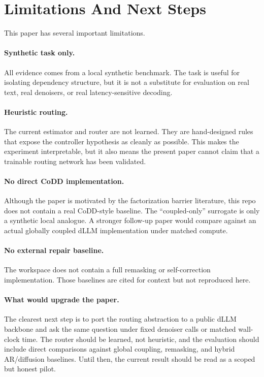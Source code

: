 \section{Limitations And Next Steps}
\label{sec:limitations}

This paper has several important limitations.

\paragraph{Synthetic task only.}
All evidence comes from a local synthetic benchmark. The task is useful for isolating dependency structure, but it is not a substitute for evaluation on real text, real denoisers, or real latency-sensitive decoding.

\paragraph{Heuristic routing.}
The current estimator and router are not learned. They are hand-designed rules that expose the controller hypothesis as cleanly as possible. This makes the experiment interpretable, but it also means the present paper cannot claim that a trainable routing network has been validated.

\paragraph{No direct CoDD implementation.}
Although the paper is motivated by the factorization barrier literature, this repo does not contain a real CoDD-style baseline. The ``coupled-only'' surrogate is only a synthetic local analogue. A stronger follow-up paper would compare against an actual globally coupled dLLM implementation under matched compute.

\paragraph{No external repair baseline.}
The workspace does not contain a full remasking or self-correction implementation. Those baselines are cited for context but not reproduced here.

\paragraph{What would upgrade the paper.}
The clearest next step is to port the routing abstraction to a public dLLM backbone and ask the same question under fixed denoiser calls or matched wall-clock time. The router should be learned, not heuristic, and the evaluation should include direct comparisons against global coupling, remasking, and hybrid AR/diffusion baselines. Until then, the current result should be read as a scoped but honest pilot.
